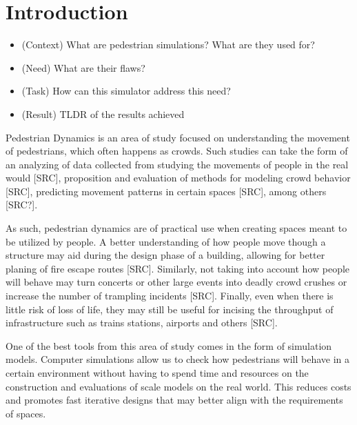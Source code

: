 \documentclass[twoside, 11pt]{article}
\begin{document}
 


\newpage

\mainmatter

\section{Introduction}

\begin{itemize}
  \item (Context) What are pedestrian simulations? What are they used for?
  \item (Need) What are their flaws?
  \item (Task) How can this simulator address this need?
  \item (Result) TLDR of the results achieved
\end{itemize}

Pedestrian Dynamics is an area of study focused on understanding the movement of pedestrians, which often happens as crowds. Such studies can take the form of an analyzing of data collected from studying the movements of people in the real would [SRC], proposition and evaluation of methods for modeling crowd behavior [SRC], predicting movement patterns in certain spaces [SRC], among others [SRC?].

As such, pedestrian dynamics are of practical use when creating spaces meant to be utilized by people. A better understanding of how people move though a structure may aid during the design phase of a building, allowing for better planing of fire escape routes [SRC]. Similarly, not taking into account how people will behave may turn concerts or other large events into deadly crowd crushes or increase the number of trampling incidents [SRC]. Finally, even when there is little risk of loss of life, they may still be useful for incising the throughput of infrastructure such as trains stations, airports and others [SRC].

One of the best tools from this area of study comes in the form of simulation models. Computer simulations allow us to check how pedestrians will behave in a certain environment without having to spend time and resources on the construction and evaluations of scale models on the real world. This reduces costs and promotes fast iterative designs that may better align with the requirements of spaces.
\end{document}
